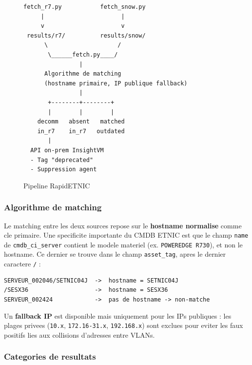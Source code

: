 \documentclass{rapport}
\begin{document}
\begin{figure}[H]
\centering
\begin{verbatim}
fetch_r7.py           fetch_snow.py
     |                      |
     v                      v
 results/r7/          results/snow/
      \                    /
       \______fetch.py____/
                |
      Algorithme de matching
      (hostname primaire, IP publique fallback)
                |
       +--------+--------+
       |        |        |
    decomm   absent   matched
    in_r7    in_r7   outdated
       |
  API on-prem InsightVM
  - Tag "deprecated"
  - Suppression agent
\end{verbatim}
\caption{Pipeline RapidETNIC}
\end{figure}

\subsubsection{Algorithme de matching}

Le matching entre les deux sources repose sur le \textbf{hostname normalise}
comme cle primaire. Une specificite importante du CMDB ETNIC est que le
champ \texttt{name} de \texttt{cmdb\_ci\_server} contient le modele
materiel (ex. \texttt{POWEREDGE R730}), et non le hostname. Ce dernier se
trouve dans le champ \texttt{asset\_tag}, apres le dernier caractere
\texttt{/} :

\begin{lstlisting}[basicstyle=\ttfamily\small, backgroundcolor=\color{codebg}, frame=single]
SERVEUR_002046/SETNIC04J  ->  hostname = SETNIC04J
/SESX36                   ->  hostname = SESX36
SERVEUR_002424            ->  pas de hostname -> non-matche
\end{lstlisting}

Un \textbf{fallback IP} est disponible mais uniquement pour les IPs
publiques : les plages privees (\texttt{10.x}, \texttt{172.16-31.x},
\texttt{192.168.x}) sont exclues pour eviter les faux positifs lies aux
collisions d'adresses entre VLANs.

\subsubsection{Categories de resultats}
\end{document}
